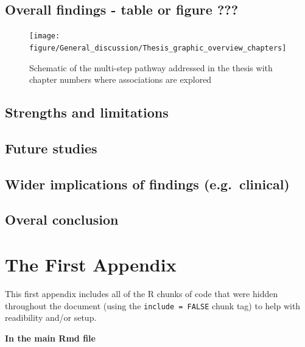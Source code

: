 \documentclass[11pt,twoside]{bristolthesis}
\begin{document}
\hypertarget{overall-findings---table-or-figure}{%
\section{Overall findings - table or figure ???}\label{overall-findings---table-or-figure}}
\begin{figure}
\texttt{[image: figure/General\_discussion/Thesis\_graphic\_overview\_chapters]} \caption[Schematic of the multi-step pathway addressed in the thesis with chapter numbers]{Schematic of the multi-step pathway addressed in the thesis with chapter numbers where associations are explored}\label{fig:Thesis-schematic-chaps}
\end{figure}
\hypertarget{strengths-and-limitations}{%
\section{Strengths and limitations}\label{strengths-and-limitations}}

\hypertarget{future-studies}{%
\section{Future studies}\label{future-studies}}

\hypertarget{wider-implications-of-findings-e.g.-clinical}{%
\section{Wider implications of findings (e.g.~clinical)}\label{wider-implications-of-findings-e.g.-clinical}}

\hypertarget{overal-conclusion}{%
\section{Overal conclusion}\label{overal-conclusion}}

\appendix

\hypertarget{the-first-appendix}{%
\chapter{The First Appendix}\label{the-first-appendix}}

This first appendix includes all of the R chunks of code that were hidden throughout the document (using the \texttt{include\ =\ FALSE} chunk tag) to help with readibility and/or setup.

\textbf{In the main Rmd file}
\end{document}
